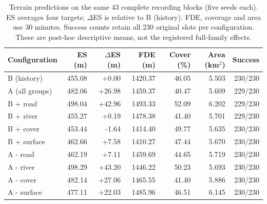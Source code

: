 \begin{table}[!htbp]\centering
\caption{Terrain predictions on the same 43 complete recording blocks (five seeds each). ES averages four targets; $\Delta$ES is relative to B (history). FDE, coverage and area use 30 minutes. Success counts retain all 230 original slots per configuration. These are post-hoc descriptive means, not the registered full-family effects.}\label{tab:terrain-description}
\small\setlength{\tabcolsep}{3pt}
\begin{tabular}{lrrrrrr}\toprule
Configuration & ES (m) & $\Delta$ES (m) & FDE (m) & Cover (\%) & Area (km$^2$) & Success\\\midrule
B (history) & 455.08 & +0.00 & 1420.37 & 46.05 & 5.503 & 230/230\\
A (all groups) & 482.06 & +26.98 & 1459.37 & 40.47 & 5.609 & 229/230\\
B + road & 498.04 & +42.96 & 1493.33 & 52.09 & 6.202 & 229/230\\
B + river & 455.27 & +0.19 & 1478.38 & 41.40 & 5.701 & 229/230\\
B + cover & 453.44 & -1.64 & 1414.40 & 49.77 & 5.635 & 230/230\\
B + surface & 462.66 & +7.58 & 1410.27 & 47.44 & 5.670 & 230/230\\
A - road & 462.19 & +7.11 & 1459.69 & 44.65 & 5.719 & 230/230\\
A - river & 498.29 & +43.20 & 1446.22 & 50.23 & 5.693 & 230/230\\
A - cover & 482.14 & +27.06 & 1465.55 & 41.40 & 5.886 & 230/230\\
A - surface & 477.11 & +22.03 & 1485.96 & 46.51 & 6.145 & 230/230\\
\bottomrule\end{tabular}
\end{table}
